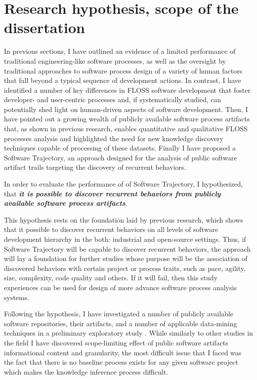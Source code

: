 \section{Research hypothesis, scope of the dissertation}\label{sec_research_hypothesis}
In previous sections, I have outlined an evidence of a limited performance of traditional engineering-like 
software processes, as well as the oversight by traditional approaches to software process 
design of a variety of human factors that fall beyond a typical sequence of development actions.
In contrast, I have identified a number of key differences in FLOSS software development that foster 
developer- and user-centric processes and, if systematically studied, can potentially shed light on 
human-driven aspects of software development. 
Then, I have pointed out a growing wealth of publicly available software process artifacts that, as shown
in previous research, enables quantitative and qualitative FLOSS processes analysis and highlighted the 
need for new knowledge discovery techniques capable of processing of these datasets.
Finally I have proposed a Software Trajectory, an approach designed for the analysis of public 
software artifact trails targeting the discovery of recurrent behaviors.

In order to evaluate the performance of of Software Trajectory, I hypothesized, 
that \textbf{\textit{it is possible to discover recurrent behaviors from publicly available software 
process artifacts}}. 

This hypothesis rests on the foundation laid by previous research, which shows that it possible to discover 
recurrent behaviors on all levels of software development hierarchy \cite{citeulike:8347315} in the both: 
industrial \cite{citeulike:5090131} and open-source \cite{citeulike:200721} settings. 
Thus, if Software Trajectory will be capable to discover recurrent behaviors, the approach will lay a foundation 
for further studies whose purpose will be the association of discovered behaviors with certain project or 
process traits, such as pace, agility, size, complexity, code quality and others. 
If it will fail, then this study experiences can be used for design of more advance software process 
analysis systems.

Following the hypothesis, I have investigated a number of publicly available software repositories,
their artifacts, and a number of applicable data-mining techniques in a preliminary exploratory study 
\cite{csdl2-10-09}. While similarly to other studies in the field I have discovered scope-limiting effect 
of public software artifacts informational content and granularity, the most difficult issue that I faced 
was the fact that there is no baseline process exists for any given software project which makes the 
knowledge inference process difficult. 

